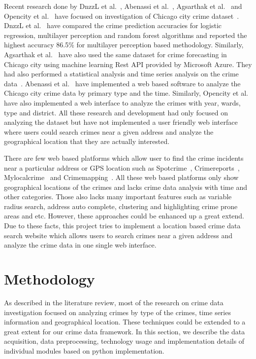 Recent research done by DnzzL et al.~\cite{hid-sp18-409-dnzzl},
Abenassi et al.~\cite{hid-sp18-409-abenassi}, Agsarthak et
al.~\cite{hid-sp18-409-agsarthak} and Opencity et
al.~\cite{hid-sp18-409-open-city} have focused on investigation of
Chicago city crime dataset~\cite{hid-sp18-409-www-data.gov}.  DnzzL et
al.~\cite{hid-sp18-409-dnzzl} have compared the crime prediction
accuracies for logistic regression, multilayer perception and random
forest algorithms and reported the highest accuracy 86.5\% for
multilayer perception based methodology. Similarly, Agsarthak et
al.~\cite{hid-sp18-409-agsarthak} have also used the same dataset for
crime forecasting in Chicago city using machine learning Rest API
provided by Microsoft Azure. They had also performed a statistical
analysis and time series analysis on the crime
data~\cite{hid-sp18-409-agsarthak}. Abenassi et
al.~\cite{hid-sp18-409-abenassi} have implemented a web based software
to analyze the Chicago city crime data by primary type and the
time. Similarly, Opencity et al.~\cite{hid-sp18-409-open-city} have
also implemented a web interface to analyze the crimes with year,
wards, type and district. All these research and development had only
focused on analyzing the dataset but have not implemented a user
friendly web interface where users could search crimes near a given
address and analyze the geographical location that they are actually
interested.

There are few web based platforms which allow user to find the crime
incidents near a particular address or GPS location such as
Spotcrime~\cite{hid-sp18-409-www-spotcrime},
Crimereports~\cite{hid-sp18-409-www-crimereports},
Mylocalcrime~\cite{hid-sp18-409-www-mylocalcrime} and
Crimemapping~\cite{hid-sp18-409-www-crimemapping}. All these web based
platforms only show geographical locations of the crimes and lacks
crime data analysis with time and other categories. Those also lacks
many important features such as variable radius search, address auto
complete, clustering and highlighting crime prone areas and
etc. However, these approaches could be enhanced up a great extend.
Due to these facts, this project tries to implement a location based
crime data search website which allows users to search crimes near a
given address and analyze the crime data in one single web interface.

\section{Methodology}
As described in the literature review, most of the research on crime
data investigation focused on analyzing crimes by type of the crimes,
time series information and geographical location. These techniques
could be extended to a great extent for our crime data framework. In
this section, we describe the data acquisition, data preprocessing,
technology usage and implementation details of individual modules
based on python implementation. 

